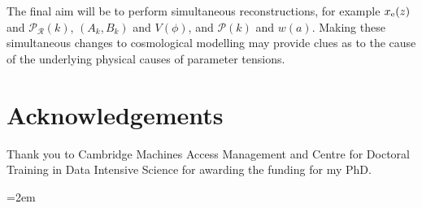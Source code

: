 \documentclass{article}
\begin{document}
The final aim will be to perform simultaneous reconstructions, for example $x_\textrm e(z)$ and $\mathcal P_\mathcal R(k)$, $(A_k, B_k)$ and $V(\phi)$, and $\mathcal P(k)$ and $w(a)$. Making these simultaneous changes to cosmological modelling may provide clues as to the cause of the underlying physical causes of parameter tensions.

\section{Acknowledgements}

Thank you to Cambridge Machines Access Management and Centre for Doctoral Training in Data Intensive Science for awarding the funding for my PhD.

\newpage
\emergencystretch=2em
\printbibliography
\end{document}
